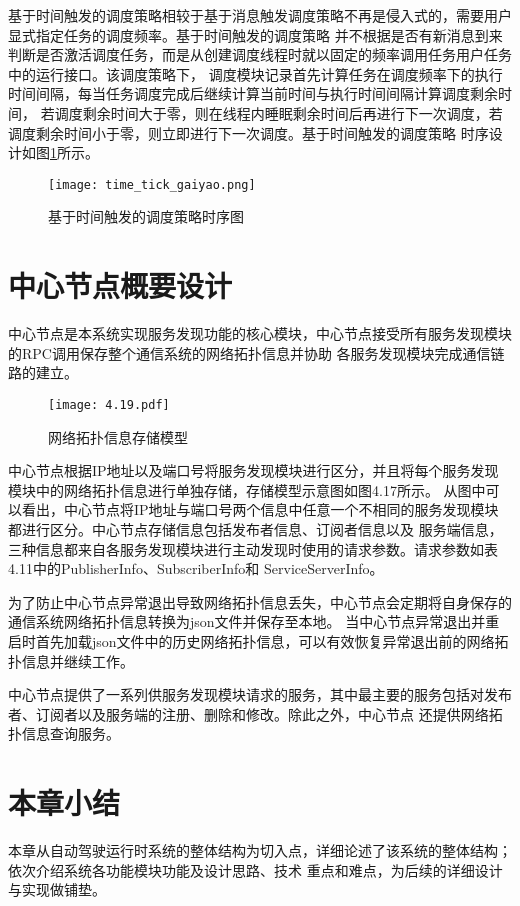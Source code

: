 基于时间触发的调度策略相较于基于消息触发调度策略不再是侵入式的，需要用户显式指定任务的调度频率。基于时间触发的调度策略
并不根据是否有新消息到来判断是否激活调度任务，而是从创建调度线程时就以固定的频率调用任务用户任务中的运行接口。该调度策略下，
调度模块记录首先计算任务在调度频率下的执行时间间隔，每当任务调度完成后继续计算当前时间与执行时间间隔计算调度剩余时间，
若调度剩余时间大于零，则在线程内睡眠剩余时间后再进行下一次调度，若调度剩余时间小于零，则立即进行下一次调度。基于时间触发的调度策略
时序设计如图\ref{time_tick_gaiyao}所示。
\begin{figure}[H]
  \centering
  \texttt{[image: time\_tick\_gaiyao.png]}
  \caption{基于时间触发的调度策略时序图}
  \label{time_tick_gaiyao}
\end{figure}

\section{中心节点概要设计}
中心节点是本系统实现服务发现功能的核心模块，中心节点接受所有服务发现模块的RPC调用保存整个通信系统的网络拓扑信息并协助
各服务发现模块完成通信链路的建立。

\begin{figure}[htb]
  \centering
  \texttt{[image: 4.19.pdf]}
  \caption{网络拓扑信息存储模型}
  \label{fig:21}
\end{figure}

中心节点根据IP地址以及端口号将服务发现模块进行区分，并且将每个服务发现模块中的网络拓扑信息进行单独存储，存储模型示意图如图4.17所示。
从图中可以看出，中心节点将IP地址与端口号两个信息中任意一个不相同的服务发现模块都进行区分。中心节点存储信息包括发布者信息、订阅者信息以及
服务端信息，三种信息都来自各服务发现模块进行主动发现时使用的请求参数。请求参数如表4.11中的PublisherInfo、SubscriberInfo和
ServiceServerInfo。

为了防止中心节点异常退出导致网络拓扑信息丢失，中心节点会定期将自身保存的通信系统网络拓扑信息转换为json文件并保存至本地。
当中心节点异常退出并重启时首先加载json文件中的历史网络拓扑信息，可以有效恢复异常退出前的网络拓扑信息并继续工作。

中心节点提供了一系列供服务发现模块请求的服务，其中最主要的服务包括对发布者、订阅者以及服务端的注册、删除和修改。除此之外，中心节点
还提供网络拓扑信息查询服务。


\section{本章小结}
本章从自动驾驶运行时系统的整体结构为切入点，详细论述了该系统的整体结构；依次介绍系统各功能模块功能及设计思路、技术
重点和难点，为后续的详细设计与实现做铺垫。




